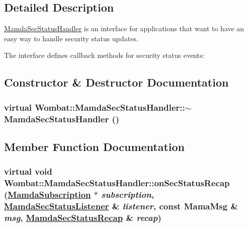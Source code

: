 \subsection{Detailed Description}
\hyperlink{classWombat_1_1MamdaSecStatusHandler}{Mamda\-Sec\-Status\-Handler} is an interface for applications that want to have an easy way to handle security status updates. 

The interface defines callback methods for security status events: 



\subsection{Constructor \& Destructor Documentation}
\hypertarget{classWombat_1_1MamdaSecStatusHandler_58d2847fe2bdcb98b81dc311e25a581b}{
\subsubsection[$\sim$MamdaSecStatusHandler]{\setlength{\rightskip}{0pt plus 5cm}virtual Wombat::Mamda\-Sec\-Status\-Handler::$\sim$Mamda\-Sec\-Status\-Handler ()}}
\label{classWombat_1_1MamdaSecStatusHandler_58d2847fe2bdcb98b81dc311e25a581b}




\subsection{Member Function Documentation}
\hypertarget{classWombat_1_1MamdaSecStatusHandler_7f49ada42883a664440776560fd6f083}{
\subsubsection[onSecStatusRecap]{\setlength{\rightskip}{0pt plus 5cm}virtual void Wombat::Mamda\-Sec\-Status\-Handler::on\-Sec\-Status\-Recap (\hyperlink{classWombat_1_1MamdaSubscription}{Mamda\-Subscription} $\ast$ {\em subscription}, \hyperlink{classWombat_1_1MamdaSecStatusListener}{Mamda\-Sec\-Status\-Listener} \& {\em listener}, const Mama\-Msg \& {\em msg}, \hyperlink{classWombat_1_1MamdaSecStatusRecap}{Mamda\-Sec\-Status\-Recap} \& {\em recap})}}
\label{classWombat_1_1MamdaSecStatusHandler_7f49ada42883a664440776560fd6f083}




